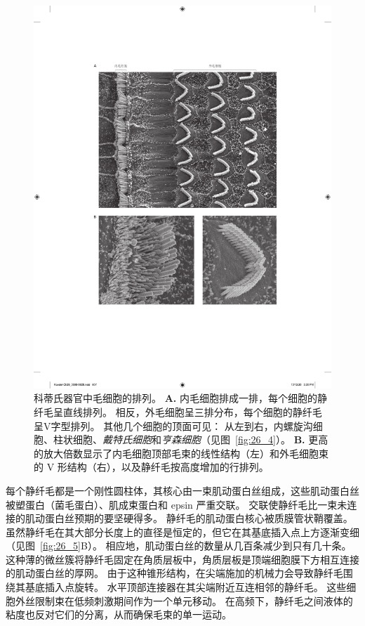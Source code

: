 \begin{figure}[htbp]
	\centering
	\includegraphics[width=1.0\linewidth]{chap26/fig_26_6}
	\caption{科蒂氏器官中毛细胞的排列。
		\textbf{A.} 内毛细胞排成一排，每个细胞的静纤毛呈直线排列。 
		相反，外毛细胞呈三排分布，每个细胞的静纤毛呈V字型排列。 
		其他几个细胞的顶面可见：
		从左到右，内螺旋沟细胞、柱状细胞、\textit{戴特氏细胞}和\textit{亨森细胞}（见图~\ref{fig:26_4}）。
		\textbf{B.} 更高的放大倍数显示了内毛细胞顶部毛束的线性结构（左）和外毛细胞束的 V 形结构（右），以及静纤毛按高度增加的行排列。}
	\label{fig:26_6}
\end{figure}


每个静纤毛都是一个刚性圆柱体，其核心由一束肌动蛋白丝组成，这些肌动蛋白丝被塑蛋白（菌毛蛋白）、肌成束蛋白和 epsin 严重交联。
交联使静纤毛比一束未连接的肌动蛋白丝预期的要坚硬得多。
静纤毛的肌动蛋白核心被质膜管状鞘覆盖。
虽然静纤毛在其大部分长度上的直径是恒定的，但它在其基底插入点上方逐渐变细（见图~\ref{fig:26_5}B）。
相应地，肌动蛋白丝的数量从几百条减少到只有几十条。 
这种薄的微丝簇将静纤毛固定在角质层板中，角质层板是顶端细胞膜下方相互连接的肌动蛋白丝的厚网。
由于这种锥形结构，在尖端施加的机械力会导致静纤毛围绕其基底插入点旋转。
水平顶部连接器在其尖端附近互连相邻的静纤毛。
这些细胞外丝限制束在低频刺激期间作为一个单元移动。 
在高频下，静纤毛之间液体的粘度也反对它们的分离，从而确保毛束的单一运动。


